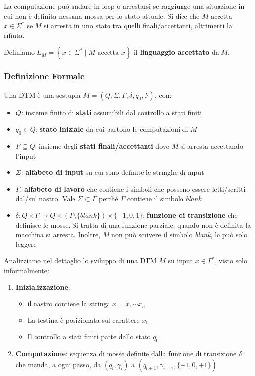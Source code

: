 La computazione può andare in loop o arrestarsi se raggiunge una situazione in cui non è definita nessuna mossa per lo stato attuale. Si dice che $M$ accetta $x \in \Sigma^\ast$ se $M$ si arresta in uno stato tra quelli finali/accettanti, altrimenti la rifiuta.

Definiamo $L_M = \left\{x \in \Sigma^\ast \mid M \text{ accetta } x \right\}$ il \textbf{linguaggio accettato} da $M$.

\subsubsection{Definizione Formale}
Una DTM è una sestupla $M = \left(Q, \Sigma, \Gamma, \delta, q_0, F\right)$, con:
\begin{itemize}
	\item $Q$: insieme finito di \textbf{stati} assumibili dal controllo a stati finiti
	
    \item $q_0 \in Q$: \textbf{stato iniziale} da cui partono le computazioni di $M$
	
    \item $F \subseteq Q$: insieme degli \textbf{stati finali/accettanti} dove $M$ si arresta accettando l'input
	
    \item $\Sigma$: \textbf{alfabeto di input} su cui sono definite le stringhe di input
	
    \item $\Gamma$: \textbf{alfabeto di lavoro} che contiene i simboli che possono essere letti/scritti dal/sul nastro. Vale $\Sigma \subset \Gamma$ perché $\Gamma$ contiene il simbolo \textit{blank}
	
    \item $\delta: Q \times \Gamma \rightarrow Q \times (\Gamma \setminus \{blank\}) \times \{-1, 0, 1\}$: \textbf{funzione di transizione} che definisce le mosse. Si tratta di una funzione parziale: quando non è definita la macchina si arresta. Inoltre, $M$ non può scrivere il simbolo \textit{blank}, lo può solo leggere
\end{itemize}

Analizziamo nel dettaglio lo sviluppo di una DTM $M$ su input $x \in \Gamma^\ast$, visto solo informalmente: 
\begin{enumerate}
	\item \textbf{Inizializzazione}: 
	\begin{itemize}
		\item il nastro contiene la stringa $x = x_1 \cdots x_n$
		
        \item La testina è posizionata sul carattere $x_1$
		
        \item Il controllo a stati finiti parte dallo stato $q_0$
	\end{itemize}
	
    \item \textbf{Computazione}: sequenza di mosse definite dalla funzione di transizione $\delta$ che manda, a ogni passo, da $(q_i, \gamma_i)$ a $(q_{i+1}, \gamma_{i+1}, \{-1, 0, +1\})$
\end{enumerate}

